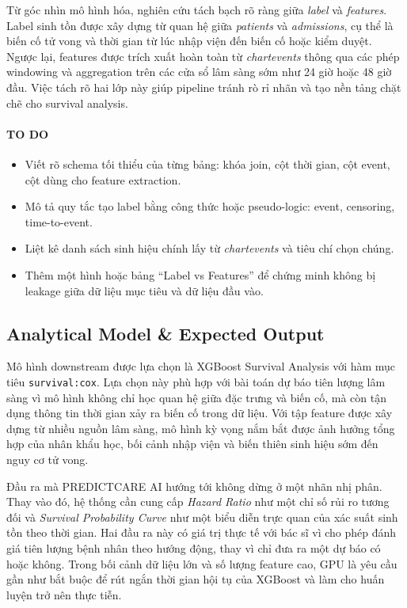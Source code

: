 Từ góc nhìn mô hình hóa, nghiên cứu tách bạch rõ ràng giữa \textit{label} và \textit{features}. Label sinh tồn được xây dựng từ quan hệ giữa \textit{patients} và \textit{admissions}, cụ thể là biến cố tử vong và thời gian từ lúc nhập viện đến biến cố hoặc kiểm duyệt. Ngược lại, features được trích xuất hoàn toàn từ \textit{chartevents} thông qua các phép windowing và aggregation trên các cửa sổ lâm sàng sớm như 24 giờ hoặc 48 giờ đầu. Việc tách rõ hai lớp này giúp pipeline tránh rò rỉ nhãn và tạo nền tảng chặt chẽ cho survival analysis.

\paragraph{TO DO}
\begin{itemize}
    \item Viết rõ schema tối thiểu của từng bảng: khóa join, cột thời gian, cột event, cột dùng cho feature extraction.
    \item Mô tả quy tắc tạo label bằng công thức hoặc pseudo-logic: event, censoring, time-to-event.
    \item Liệt kê danh sách sinh hiệu chính lấy từ \textit{chartevents} và tiêu chí chọn chúng.
    \item Thêm một hình hoặc bảng ``Label vs Features'' để chứng minh không bị leakage giữa dữ liệu mục tiêu và dữ liệu đầu vào.
\end{itemize}

\subsection{Analytical Model \& Expected Output}
Mô hình downstream được lựa chọn là XGBoost Survival Analysis với hàm mục tiêu \texttt{survival:cox}. Lựa chọn này phù hợp với bài toán dự báo tiên lượng lâm sàng vì mô hình không chỉ học quan hệ giữa đặc trưng và biến cố, mà còn tận dụng thông tin thời gian xảy ra biến cố trong dữ liệu. Với tập feature được xây dựng từ nhiều nguồn lâm sàng, mô hình kỳ vọng nắm bắt được ảnh hưởng tổng hợp của nhân khẩu học, bối cảnh nhập viện và biến thiên sinh hiệu sớm đến nguy cơ tử vong.

Đầu ra mà PREDICTCARE AI hướng tới không dừng ở một nhãn nhị phân. Thay vào đó, hệ thống cần cung cấp \textit{Hazard Ratio} như một chỉ số rủi ro tương đối và \textit{Survival Probability Curve} như một biểu diễn trực quan của xác suất sinh tồn theo thời gian. Hai đầu ra này có giá trị thực tế với bác sĩ vì cho phép đánh giá tiên lượng bệnh nhân theo hướng động, thay vì chỉ đưa ra một dự báo có hoặc không. Trong bối cảnh dữ liệu lớn và số lượng feature cao, GPU là yêu cầu gần như bắt buộc để rút ngắn thời gian hội tụ của XGBoost và làm cho huấn luyện trở nên thực tiễn.

